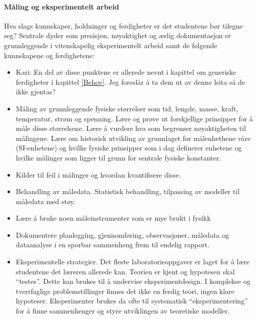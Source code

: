 \documentclass{article}
\begin{document}
\paragraph{Måling og eksperimentelt arbeid}
Hva slags kunnskaper, holdninger og ferdigheter er det studentene bør tilegne seg? Sentrale dyder som presisjon, nøyaktighet og ærlig dokumentasjon er grunnleggende i vitenskapelig eksperimentelt arbeid samt de følgende kunnskapene og ferdighetene:
\begin{itemize}
    \item {\color{red} Kari: En del av disse punktene er allerede nevnt i kapittel om generiske ferdigheter i kapittel \ref{Behov}. Jeg foreslår å ta dem ut av denne lsita så de ikke gjentas?}
  \item Måling av grunnleggende fysiske størrelser som tid, lengde, masse, kraft, temperatur, strøm og spenning. Lære og prøve ut forskjellige prinsipper for å måle disse størrelsene. Lære å vurdere hva som begrenser nøyaktigheten til målingene. Lære om historisk utvikling av grunnlaget for målenhethene våre (SI-enhetene) og hvilke fysiske prinsipper som i dag definerer enhetene og hvilke målinger som ligger til grunn for sentrale fysiske konstanter.
  \item Kilder til feil i målinger og hvordan kvantifisere disse.
  \item Behandling av måledata. Statistisk behandling, tilpassing av modeller til måledata med støy.
  \item Lære å bruke noen måleinstrumenter som er mye brukt i fysikk
  \item Dokumentere planlegging, gjennomføring, observasjoner, måledata og dataanalyse i en sporbar sammenheng frem til endelig rapport.
  \item Eksperimentelle strategier. Det fleste laboratorieoppgaver er laget for å lære studentene det læreren allerede kan. Teorien er kjent og hypotesen skal ``testes''. Dette kan brukes til å undervise eksperimentdesign. I komplekse og tverrfaglige problemstillinger finnes det ikke en ferdig teori, ingen klare hypoteser. Eksperimenter brukes da ofte til systematisk ``eksperimentering'' for å finne sammenhenger og styre utviklingen av teoretiske modeller. 
\end{itemize}
\end{document}
